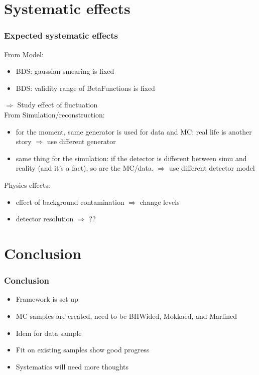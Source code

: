 \documentclass[handout]{beamer}
\begin{document}
\section{Systematic effects}
\begin{frame}
\frametitle{Expected systematic effects}
From Model:
\begin{itemize}
  \item BDS: gaussian smearing is fixed
  \item BDS: validity range of BetaFunctions is fixed
\end{itemize}
  $\Rightarrow$ Study effect of fluctuation\\
\pause
From Simulation/reconstruction:
\begin{itemize}
  \item for the moment, same generator is used for data and MC: real life is
  another story $\Rightarrow$ use different generator
  \item same thing for the simulation: if the detector is different between
  simu and reality (and it's a fact), so are the MC/data. $\Rightarrow$ use
  different detector model
\end{itemize}
\pause
Physics effects:
\begin{itemize}
  \item effect of background contamination $\Rightarrow$ change levels
  \item detector resolution $\Rightarrow$ ??
\end{itemize}
\end{frame}
\section{Conclusion}
\begin{frame}
\frametitle{Conclusion}
\begin{itemize}
  \item Framework is set up
  \item MC samples are created, need to be BHWided, Mokkaed, and Marlined
  \item Idem for data sample
  \item Fit on existing samples show good progress
  \item Systematics will need more thoughts
\end{itemize}

\end{frame}
\end{document}
